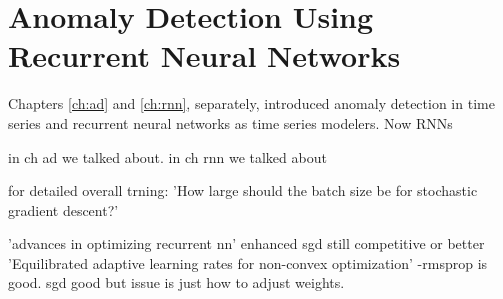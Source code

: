
\chapter[]{Anomaly Detection Using Recurrent Neural Networks}


Chapters \ref{ch:ad} and \ref{ch:rnn}, separately, introduced anomaly detection in time series and recurrent neural networks as time series modelers. Now RNNs 

in ch ad we talked about. in ch rnn we talked about

for detailed overall trning: 'How large should the batch size be for stochastic gradient descent?'


'advances in optimizing recurrent nn' enhanced sgd still competitive or better
'Equilibrated adaptive learning rates for non-convex optimization' -rmsprop is good. sgd good but issue is just how to adjust weights.


